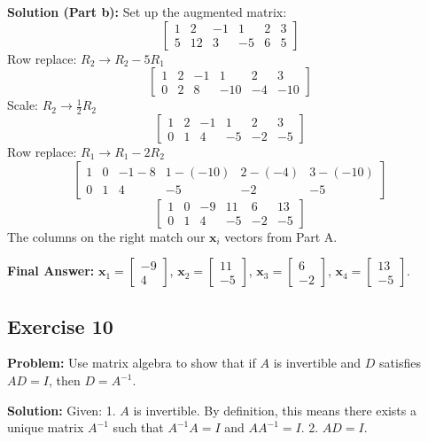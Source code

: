 \documentclass[11pt]{article}
\begin{document}
\textbf{Solution (Part b):}
Set up the augmented matrix:
\[ \left[ \begin{array}{cc|cccc} 1 & 2 & -1 & 1 & 2 & 3 \\ 5 & 12 & 3 & -5 & 6 & 5 \end{array} \right] \]
Row replace: $R_2 \to R_2 - 5R_1$
\[ \left[ \begin{array}{cc|cccc} 1 & 2 & -1 & 1 & 2 & 3 \\ 0 & 2 & 8 & -10 & -4 & -10 \end{array} \right] \]
Scale: $R_2 \to \frac{1}{2}R_2$
\[ \left[ \begin{array}{cc|cccc} 1 & 2 & -1 & 1 & 2 & 3 \\ 0 & 1 & 4 & -5 & -2 & -5 \end{array} \right] \]
Row replace: $R_1 \to R_1 - 2R_2$
\[ \left[ \begin{array}{cc|cccc} 1 & 0 & -1 - 8 & 1 - (-10) & 2 - (-4) & 3 - (-10) \\ 0 & 1 & 4 & -5 & -2 & -5 \end{array} \right] \]
\[ \left[ \begin{array}{cc|cccc} 1 & 0 & -9 & 11 & 6 & 13 \\ 0 & 1 & 4 & -5 & -2 & -5 \end{array} \right] \]
The columns on the right match our $\mathbf{x}_i$ vectors from Part A. 

\textbf{Final Answer:} 
$\mathbf{x}_1 = \begin{bmatrix} -9 \\ 4 \end{bmatrix}$, $\mathbf{x}_2 = \begin{bmatrix} 11 \\ -5 \end{bmatrix}$, $\mathbf{x}_3 = \begin{bmatrix} 6 \\ -2 \end{bmatrix}$, $\mathbf{x}_4 = \begin{bmatrix} 13 \\ -5 \end{bmatrix}$.

\subsection{Exercise 10}
\textbf{Problem:} Use matrix algebra to show that if $A$ is invertible and $D$ satisfies $AD = I$, then $D = A^{-1}$.

\textbf{Solution:}
Given:
1. $A$ is invertible. By definition, this means there exists a unique matrix $A^{-1}$ such that $A^{-1}A = I$ and $AA^{-1} = I$.
2. $AD = I$.
\end{document}
